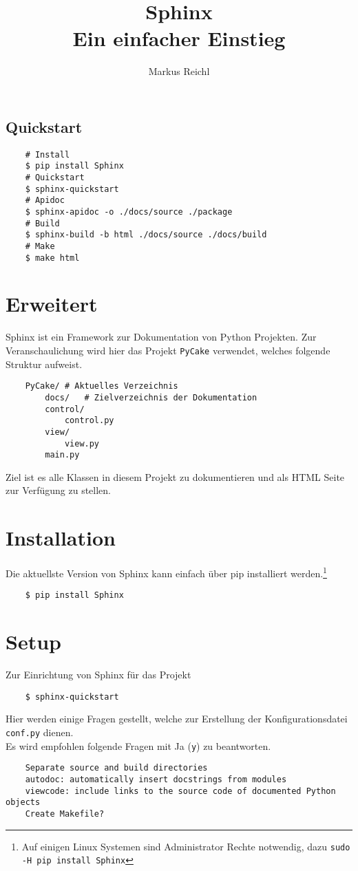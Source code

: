 \documentclass[a4paper,11pt]{article}
\title{
    \huge{Sphinx} \vspace{0.5 em} \\
    \large{Ein einfacher Einstieg}
}
\author{Markus Reichl}
\newcommand{\lskip}{\vspace{0.5 em} \\}
\begin{document}
\maketitle

\subsection*{Quickstart}
\begin{verbatim}
    # Install
    $ pip install Sphinx
    # Quickstart
    $ sphinx-quickstart
    # Apidoc
    $ sphinx-apidoc -o ./docs/source ./package
    # Build
    $ sphinx-build -b html ./docs/source ./docs/build
    # Make
    $ make html
\end{verbatim}

\section*{Erweitert}
Sphinx ist ein Framework zur Dokumentation von Python Projekten.
Zur Veranschaulichung wird hier das Projekt \texttt{PyCake} verwendet, welches folgende Struktur aufweist.
\begin{verbatim}
    PyCake/ # Aktuelles Verzeichnis
        docs/   # Zielverzeichnis der Dokumentation
        control/
            control.py
        view/
            view.py
        main.py
\end{verbatim}
Ziel ist es alle Klassen in diesem Projekt zu dokumentieren und als HTML Seite zur Verfügung zu stellen.

\newpage
\section{Installation}
Die aktuellste Version von Sphinx kann einfach über pip installiert werden.\footnote{Auf einigen Linux Systemen sind Administrator Rechte notwendig, dazu \texttt{sudo -H pip install Sphinx}}
\begin{verbatim}
    $ pip install Sphinx
\end{verbatim}

\section{Setup}
Zur Einrichtung von Sphinx für das Projekt
\begin{verbatim}
    $ sphinx-quickstart
\end{verbatim}
Hier werden einige Fragen gestellt, welche zur Erstellung der Konfigurationsdatei \texttt{conf.py} dienen.
\lskip{}
Es wird empfohlen folgende Fragen mit Ja (\texttt{y}) zu beantworten.
\begin{verbatim}
    Separate source and build directories
    autodoc: automatically insert docstrings from modules
    viewcode: include links to the source code of documented Python objects
    Create Makefile?
\end{verbatim}
\end{document}
